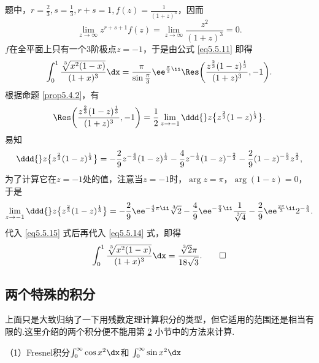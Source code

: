 \begin{solution}
题中，$r=\frac23,s=\frac13,r+s=1,f(z)=\frac1{(1+z)^3}$，因而
\[\lim_{z\to\infty}z^{r+s+1}f(z)=\lim_{z\to\infty}\frac{z^2}{(1+z)^3}=0.\]
$f$在全平面上只有一个$3$阶极点$z=-1$，于是由公式 \eqref{eq5.5.11} 即得
\begin{equation}\label{eq5.5.14}
\int_0^1\frac{\sqrt[\leftroot{-1}\uproot{2}3]{x^2(1-x)}}{(1+x)^3}\dx
=\frac\pi{\sin\frac\pi3}\ee^{\frac\pi3\ii}\Res
\bigg(\frac{z^{\frac23}(1-z)^{\frac13}}{(1+z)^3},-1\bigg).
\end{equation}
根据命题 \ref{prop5.4.2}，有
\begin{equation}\label{eq5.5.15}
\Res\bigg(\frac{z^{\frac23}(1-z)^{\frac13}}{(1+z)^3},-1\bigg)=\frac12
\lim_{z\to-1}\ddd{}z\big\{z^{\frac23}(1-z)^{\frac13}\big\}.
\end{equation}
易知
\[\ddd{}z\big\{z^{\frac23}(1-z)^{\frac13}\big\}=-\frac29z^{-\frac43}(1-z)^{\frac13}
-\frac49z^{-\frac13}(1-z)^{-\frac23}-\frac29(1-z)^{-\frac53}z^{\frac23},\]
为了计算它在$z=-1$处的值，注意当$z=-1$时，$\arg z=\pi$，$\arg(1-z)=0$，于是
\[\lim_{z\to-1}\ddd{}z\big\{z^{\frac23}(1-z)^{\frac13}\big\}
=-\frac29\ee^{-\frac43\pi\ii}\sqrt[\leftroot{-1}\uproot{2}3]2-
\frac49\ee^{-\frac\pi3\ii}\frac1{\sqrt[\leftroot{-1}\uproot{2}3]4}-
\frac29\ee^{\frac{2\pi}3\ii}2^{-\frac53}.\]
代入 \eqref{eq5.5.15} 式后再代入 \eqref{eq5.5.14} 式，即得
\begin{equation*}
  \int_0^1\frac{\sqrt[\leftroot{-1}\uproot{2}3]{x^2(1-x)}}{(1+x)^3}\dx
  =\frac{\sqrt[\leftroot{-1}\uproot{2}3]2\pi}{18\sqrt3}. \qedhere
\end{equation*}
\end{solution}

\subsection{两个特殊的积分}
上面只是大致归纳了一下用残数定理计算积分的类型，但它适用的范围还是相当有限的.这里介绍的两个积分便不能用第 \hyperlink{sec5.5.2}{2} 小节中的方法来计算.

（1）{\kaishu Fresnel积分$\int_0^\infty\cos x^2\dx$和
$\int_0^\infty\sin x^2\dx$}

